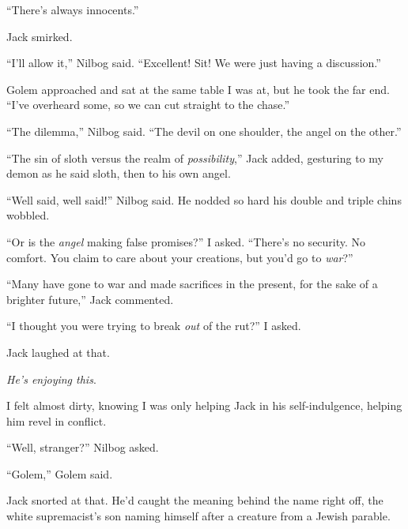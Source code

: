 ``There's always innocents.''



Jack smirked.



``I'll allow it,'' Nilbog said.  ``Excellent!  Sit!  We were just having a discussion.''



Golem approached and sat at the same table I was at, but he took the far end.  ``I've overheard some, so we can cut straight to the chase.''



``The dilemma,'' Nilbog said.  ``The devil on one shoulder, the angel on the other.''



``The sin of sloth versus the realm of \emph{possibility},'' Jack added, gesturing to my demon as he said sloth, then to his own angel.



``Well said, well said!'' Nilbog said.  He nodded so hard his double and triple chins wobbled.



``Or is the \emph{angel} making false promises?'' I asked.  ``There's no security.  No comfort.  You claim to care about your creations, but you'd go to \emph{war}?''



``Many have gone to war and made sacrifices in the present, for the sake of a brighter future,'' Jack commented.



``I thought you were trying to break \emph{out} of the rut?'' I asked.



Jack laughed at that.



\emph{He's enjoying this}.



I felt almost dirty, knowing I was only helping Jack in his self-indulgence, helping him revel in conflict.



``Well, stranger?'' Nilbog asked.



``Golem,'' Golem said.



Jack snorted at that.  He'd caught the meaning behind the name right off, the white supremacist's son naming himself after a creature from a Jewish parable.



